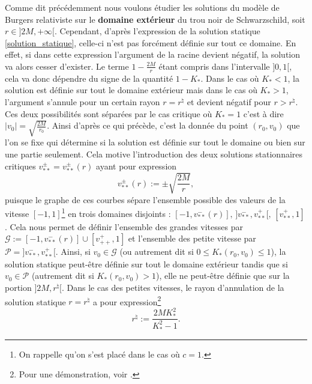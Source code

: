 \documentclass[11pt,a4paper]{article}
\begin{document}
Comme dit précédemment nous voulons étudier les solutions du modèle de Burgers relativiste sur le \textbf{domaine extérieur} du trou noir de Schwarzschild, soit $r\in ]2M,+\infty[$. Cependant, d'après l'expression de la solution statique \eqref{solution_statique}, celle-ci n'est pas forcément définie sur tout ce domaine. En effet, si dans cette expression l'argument de la racine devient négatif, la solution va alors cesser d'exister. Le terme $1 -\frac{2M}{r}$ étant compris dans l'intervalle $]0,1[$, cela va donc dépendre du signe de la quantité $1 - K_*$. Dans le cas où $K_*<1$, la solution est définie sur tout le domaine extérieur mais dans le cas où $K_*>1$, l'argument s'annule pour un certain rayon $r = r^\natural$ et devient négatif pour $r> r^\natural$. Ces deux possibilités sont séparées par le cas critique où $K_*=1$ c'est à dire $|v_0| = \sqrt{\frac{2M}{r_0}}$. Ainsi d'après ce qui précède, c'est la donnée du point $(r_0, v_0)$ que l'on se fixe qui détermine si la solution est définie sur tout le domaine ou bien sur une partie seulement. Cela motive l'introduction des deux solutions stationnaires critiques $v^\pm_{**} = v^\pm_{**}(r)$ ayant pour expression
\begin{equation}
v^\pm_{**}(r) := \pm\sqrt{\frac{2M}{r}},
\end{equation}
puisque le graphe de ces courbes sépare l'ensemble possible des valeurs de la vitesse $[-1,1]$\footnote{On rappelle qu'on s'est placé dans le cas où $c=1$.} en trois domaines disjoints : $[-1,v_{**}^-(r)],\, ]v_{**}^-,v_{**}^+[,\, [v_{**}^+, 1]$. Cela nous permet de définir l'ensemble des grandes vitesses par $\mathcal{G} :=[-1,v_{**}^-(r)] \cup[v_{++}^+, 1]$ et l'ensemble des petite vitesse par $\mathcal{P} = ]v_{**}^-,v_{**}^+[$. Ainsi, si $v_0\in\mathcal{G}$ (ou autrement dit si $0\leq K_*(r_0,v_0) \leq 1$), la solution statique peut-être définie sur tout le domaine extérieur tandis que si $v_0\in\mathcal{P}$ (autrement dit si $K_*(r_0,v_0) > 1$), elle ne peut-être définie que sur la portion $]2M, r^\natural[$. Dans le cas des petites vitesses, le rayon d'annulation de la solution statique $r=r^\natural$ a pour expression\footnote{Pour une démonstration, voir \cite{PLF-SX-one}.}
\begin{equation}\label{rayon_annulation}
	r^\natural := \frac{2MK_*^2}{K_*^2 -1}.
\end{equation}

\end{document}
